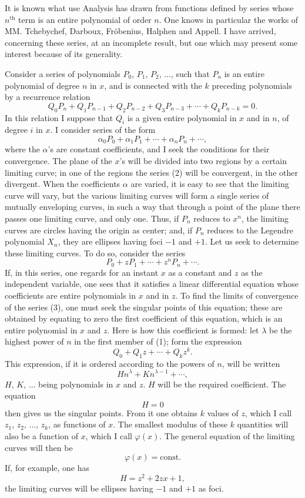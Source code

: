 \documentclass[11pt]{article}
\begin{document}
It is known what use Analysis has drawn from functions defined by series whose $n^{\text{th}}$ term is an entire polynomial of order $n$. One knows in particular the works of MM. Tchebychef, Darboux, Fröbenius, Halphen and Appell. I have arrived, concerning these series, at an incomplete result, but one which may present some interest because of its generality.

Consider a series of polynomials $P_0$, $P_1$, $P_2$, $\ldots$, such that $P_n$ is an entire polynomial of degree $n$ in $x$, and is connected with the $k$ preceding polynomials by a recurrence relation
\[
\tag{1}
Q_0P_n+Q_1P_{n-1}+Q_2P_{n-2}+Q_3P_{n-3}+\cdots+Q_kP_{n-k}=0.
\]
In this relation I suppose that $Q_i$ is a given entire polynomial in $x$ and in $n$, of degree $i$ in $x$. I consider series of the form
\[
\tag{2}
\alpha_0P_0+\alpha_1P_1+\cdots+\alpha_nP_n+\cdots,
\]
where the $\alpha$'s are constant coefficients, and I seek the conditions for their convergence. The plane of the $x$'s will be divided into two regions by a certain limiting curve; in one of the regions the series (2) will be convergent, in the other divergent. When the coefficients $\alpha$ are varied, it is easy to see that the limiting curve will vary, but the various limiting curves will form a single series of mutually enveloping curves, in such a way that through a point of the plane there passes one limiting curve, and only one. Thus, if $P_n$ reduces to $x^n$, the limiting curves are circles having the origin as center; and, if $P_n$ reduces to the Legendre polynomial $X_n$, they are ellipses having foci $-1$ and $+1$. Let us seek to determine these limiting curves. To do so, consider the series
\[
\tag{3}
P_0+zP_1+\cdots+z^nP_n+\cdots.
\]
If, in this series, one regards for an instant $x$ as a constant and $z$ as the independent variable, one sees that it satisfies a linear differential equation whose coefficients are entire polynomials in $x$ and in $z$. To find the limits of convergence of the series (3), one must seek the singular points of this equation; these are obtained by equating to zero the first coefficient of this equation, which is an entire polynomial in $x$ and $z$. Here is how this coefficient is formed: let $\lambda$ be the highest power of $n$ in the first member of (1); form the expression
\[
Q_0+Q_1z+\cdots+Q_kz^k.
\]
This expression, if it is ordered according to the powers of $n$, will be written
\[
Hn^\lambda+Kn^{\lambda-1}+\cdots,
\]
$H$, $K$, $\ldots$ being polynomials in $x$ and $z$. $H$ will be the required coefficient. The equation
\[
H=0
\]
then gives us the singular points. From it one obtains $k$ values of $z$, which I call $z_1$, $z_2$, $\ldots$, $z_k$, as functions of $x$. The smallest modulus of these $k$ quantities will also be a function of $x$, which I call $\varphi(x)$. The general equation of the limiting curves will then be
\[
\varphi(x)=\text{const.}
\]
If, for example, one has
\[
H=z^2+2zx+1,
\]
the limiting curves will be ellipses having $-1$ and $+1$ as foci.
\end{document}
